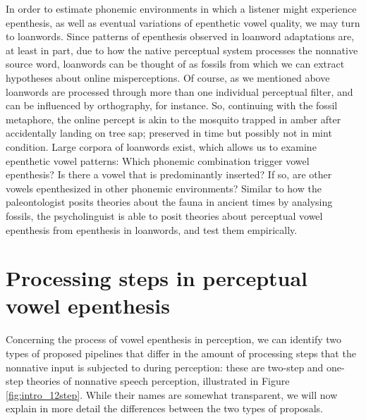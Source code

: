 In order to estimate phonemic environments in which a listener might experience epenthesis, as well as eventual variations of epenthetic vowel quality, we may turn to loanwords. Since patterns of epenthesis observed in loanword adaptations are, at least in part, due to how the native perceptual system processes the nonnative source word, loanwords can be thought of as fossils from which we can extract hypotheses about online misperceptions. Of course, as we mentioned above loanwords are processed through more than one individual perceptual filter, and can be influenced by orthography, for instance. So, continuing with the fossil metaphore, the online percept is akin to the mosquito trapped in amber after accidentally landing on tree sap; preserved in time but possibly not in mint condition. Large corpora of loanwords exist, which allows us to examine epenthetic vowel patterns: Which phonemic combination trigger vowel epenthesis? Is there a vowel that is predominantly inserted? If so, are other vowels epenthesized in other phonemic environments? Similar to how the paleontologist posits theories about the fauna in ancient times by analysing fossils, the psycholinguist is able to posit theories about perceptual vowel epenthesis from epenthesis in loanwords, and test them empirically.   
   
\section{Processing steps in perceptual vowel epenthesis}

Concerning the process of vowel epenthesis in perception, we can identify two types of proposed pipelines that differ in the amount of processing steps that the nonnative input is subjected to during perception: these are two-step and one-step theories of nonnative speech perception, illustrated in Figure \ref{fig:intro_12step}. While their names are somewhat transparent, we will now explain in more detail the differences between the two types of proposals.   

